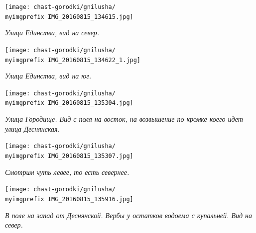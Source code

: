 \newpage

\begin{center}
\texttt{[image: chast-gorodki/gnilusha/\\myimgprefix IMG\_20160815\_134615.jpg]}

\textit{Улица Единства, вид на север.}
\end{center}

\begin{center}
\texttt{[image: chast-gorodki/gnilusha/\\myimgprefix IMG\_20160815\_134622\_1.jpg]}

\textit{Улица Единства, вид на юг.}
\end{center}

\newpage




\begin{center}
\texttt{[image: chast-gorodki/gnilusha/\\myimgprefix IMG\_20160815\_135304.jpg]}

\textit{Улица Городище. Вид с поля на восток, на возвышение по кромке коего идет улица Деснянская.}
\end{center}

\begin{center}
\texttt{[image: chast-gorodki/gnilusha/\\myimgprefix IMG\_20160815\_135307.jpg]}

\textit{Смотрим чуть левее, то есть севернее.}
\end{center}

\newpage

\begin{center}
\texttt{[image: chast-gorodki/gnilusha/\\myimgprefix IMG\_20160815\_135916.jpg]}

\textit{В поле на запад от Деснянской. Вербы у остатков водоема с купальней. Вид на север.}
\end{center}


